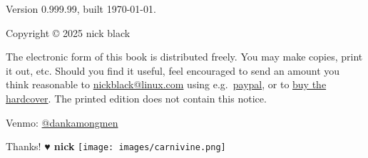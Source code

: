 \clearpage
Version 0.999.99, built \today.

Copyright © 2025 nick black

\bigskip
The electronic form of this book is distributed freely.
You may make copies, print it out, etc.
Should you find it useful, feel encouraged to send an amount you think reasonable to
  \href{mailto:nickblack@linux.com}{nickblack@linux.com} using
  e.g.\ \href{https://paypal.me/dankamongmen}{paypal},
  or to \href{https://goldandappelpub.com/pgo-quantitative.html}{buy the hardcover}.
The printed edition does not contain this notice.

\bigskip
Venmo: \href{https://venmo.com/?txn=pay&audience=friends&recipients=dankamongmen&amount=10&note=pgoquant}{@dankamongmen}

\bigskip
Thanks! {\textbf{♥ nick}}
\vfill\texttt{[image: images/carnivine.png]}\vfill
